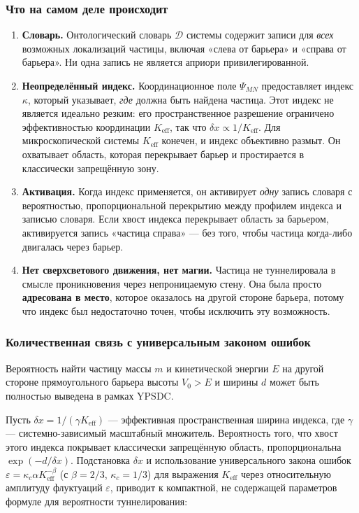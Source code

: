 \documentclass[12pt,a4paper]{article}
\theoremstyle{remark}
\begin{document}
	\subsubsection{Что на самом деле происходит}
	
	\begin{enumerate}[leftmargin=*]
		\item \textbf{Словарь.}
		Онтологический словарь $\mathcal{D}$ системы содержит записи для \emph{всех} возможных локализаций частицы, включая «слева от барьера» и «справа от барьера». Ни одна запись не является априори привилегированной.
		
		\item \textbf{Неопределённый индекс.}
		Координационное поле $\Psi_{MN}$ предоставляет индекс $\kappa$, который указывает, \emph{где} должна быть найдена частица. Этот индекс не является идеально резким: его пространственное разрешение ограничено эффективностью координации $K_{\mathrm{eff}}$, так что $\delta x \propto 1/K_{\mathrm{eff}}$. Для микроскопической системы $K_{\mathrm{eff}}$ конечен, и индекс объективно размыт. Он охватывает область, которая перекрывает барьер и простирается в классически запрещённую зону.
		
		\item \textbf{Активация.}
		Когда индекс применяется, он активирует \emph{одну} запись словаря с вероятностью, пропорциональной перекрытию между профилем индекса и записью словаря. Если хвост индекса перекрывает область за барьером, активируется запись «частица справа» — без того, чтобы частица когда-либо двигалась через барьер.
		
		\item \textbf{Нет сверхсветового движения, нет магии.}
		Частица не туннелировала в смысле проникновения через непроницаемую стену. Она была просто \textbf{адресована в место}, которое оказалось на другой стороне барьера, потому что индекс был недостаточно точен, чтобы исключить эту возможность.
	\end{enumerate}
	
	\subsubsection{Количественная связь с универсальным законом ошибок}
	
	Вероятность найти частицу массы $m$ и кинетической энергии $E$ на другой стороне прямоугольного барьера высоты $V_0>E$ и ширины $d$ может быть полностью выведена в рамках YPSDC.
	
	Пусть $\delta x = 1/(\gamma K_{\mathrm{eff}})$ — эффективная пространственная ширина индекса, где $\gamma$ — системно-зависимый масштабный множитель. Вероятность того, что хвост этого индекса покрывает классически запрещённую область, пропорциональна $\exp(-d / \delta x)$. Подстановка $\delta x$ и использование универсального закона ошибок $\varepsilon = \kappa_c \alpha K_{\mathrm{eff}}^{-\beta}$ (с $\beta=2/3$, $\kappa_c=1/3$) для выражения $K_{\mathrm{eff}}$ через относительную амплитуду флуктуаций $\varepsilon$, приводит к компактной, не содержащей параметров формуле для вероятности туннелирования:
	
\end{document}
